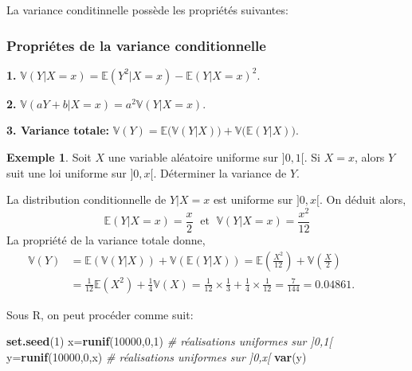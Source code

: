 \documentclass[
]{book}
\newenvironment{Shaded}{\begin{snugshade}}{\end{snugshade}}
\newcommand{\CommentTok}[1]{\textcolor[rgb]{0.56,0.35,0.01}{\textit{#1}}}
\newcommand{\DecValTok}[1]{\textcolor[rgb]{0.00,0.00,0.81}{#1}}
\newcommand{\KeywordTok}[1]{\textcolor[rgb]{0.13,0.29,0.53}{\textbf{#1}}}
\newcommand{\NormalTok}[1]{#1}
\theoremstyle{definition}
\theoremstyle{definition}
\newtheorem{example}{Exemple}[chapter]
\theoremstyle{definition}
\theoremstyle{remark}
\begin{document}
La variance conditinnelle possède les propriétés suivantes:

\hypertarget{propriuxe9tes-de-la-variance-conditionnelle}{%
\subsubsection*{Propriétes de la variance conditionnelle}\label{propriuxe9tes-de-la-variance-conditionnelle}}

\textbf{1.} \(\mathbb{V}\left(Y|X=x \right)=\mathbb{E}\left(Y^2|X=x \right)-\mathbb{E}\left(Y|X=x \right)^2\).

\textbf{2.} \(\mathbb{V}(aY + b|X = x) = a^2\mathbb{V}(Y|X = x)\).

\textbf{3. Variance totale:} \(\mathbb{V}(Y) = \mathbb{E}\bigl(\mathbb{V}(Y|X)\bigr) + \mathbb{V}\bigl(\mathbb{E}(Y|X)\bigr)\).

\begin{example}
\protect\hypertarget{exm:unnamed-chunk-31}{}{\label{exm:unnamed-chunk-31} }Soit \(X\) une variable aléatoire uniforme sur \(]0,1[\). Si \(X=x\), alors \(Y\) suit une loi uniforme sur \(]0,x[\). Déterminer la variance de \(Y\).
\end{example}
La distribution conditionnelle de \(Y|X=x\) est uniforme sur \(]0,x[\). On déduit alors,
\[\mathbb{E}(Y|X = x) = \dfrac{x}{2} \; \text{ et }\; \mathbb{V}(Y|X = x) = \dfrac{x^2}{12}\]
La propriété de la variance totale donne,
\begin{align*}\mathbb{V}(Y) &= \mathbb{E}(\mathbb{V}(Y|X)) + \mathbb{V}(\mathbb{E}(Y|X)) = \mathbb{E}
\left(\frac{X^2}{12}\right)
+ \mathbb{V}\left(\frac{X}{2}
\right)\qquad \qquad \\
&=\frac{1}{12}\mathbb{E}
\left(X^2\right)+\frac{1}{4}\mathbb{V}\left(X\right)=\frac{1}{12}\times \frac{1}{3}+\frac{1}{4}\times \frac{1}{12}=\frac{7}{144}=0.04861.
\end{align*}

Sous R, on peut procéder comme suit:

\begin{Shaded}
\begin{Highlighting}[]
\KeywordTok{set.seed}\NormalTok{(}\DecValTok{1}\NormalTok{)}
\NormalTok{x=}\KeywordTok{runif}\NormalTok{(}\DecValTok{10000}\NormalTok{,}\DecValTok{0}\NormalTok{,}\DecValTok{1}\NormalTok{)  }\CommentTok{# réalisations uniformes sur ]0,1[}
\NormalTok{y=}\KeywordTok{runif}\NormalTok{(}\DecValTok{10000}\NormalTok{,}\DecValTok{0}\NormalTok{,x)  }\CommentTok{# réalisations uniformes sur ]0,x[}
\KeywordTok{var}\NormalTok{(y)  }
\end{Highlighting}
\end{Shaded}
\end{document}
